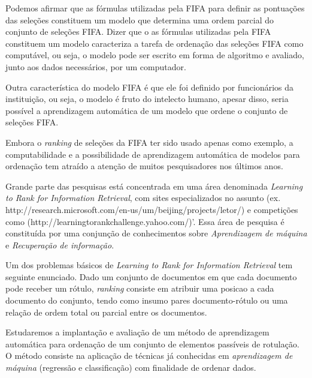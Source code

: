 Podemos afirmar que as fórmulas utilizadas pela FIFA para definir as pontuações das seleções constituem um modelo que determina uma ordem parcial do conjunto de seleções FIFA. Dizer que o as fórmulas utilizadas pela FIFA constituem um modelo caracteriza a tarefa de ordenação das seleções FIFA como computável, ou seja, o modelo pode ser escrito em forma de algoritmo e avaliado, junto aos dados necessários, por um computador.

Outra característica do modelo FIFA é que ele foi definido por funcionários da instituição, ou seja, o modelo é fruto do intelecto humano, apesar disso, seria possível a aprendizagem automática de um modelo que ordene o conjunto de seleções FIFA.

Embora o \emph{ranking} de seleções da FIFA ter sido usado apenas como exemplo, a computabilidade e a possibilidade de aprendizagem automática de modelos para ordenação tem atraído a atenção de muitos pesquisadores nos últimos anos.

Grande parte das pesquisas está concentrada em uma área denominada \emph{Learning to Rank for Information Retrieval}, com sites especializados no assunto (ex. http://research.microsoft.com/en-us/um/beijing/projects/letor/) e competições como (http://learningtorankchallenge.yahoo.com/)'. Essa área de pesquisa é constituída por uma conjunção de conhecimentos sobre \emph{Aprendizagem de máquina} e \emph{Recuperação de informação}.

Um dos problemas básicos de \emph{Learning to Rank for Information Retrieval} tem seguinte enunciado. Dado um conjunto de documentos em que cada documento pode receber um rótulo, \emph{ranking} consiste em atribuir uma posicao a cada documento do conjunto, tendo como insumo pares documento-rótulo ou uma relação de ordem total ou parcial entre os documentos.

Estudaremos a implantação e avaliação de um método de aprendizagem automática para ordenação de um conjunto de elementos passíveis de rotulação. O método consiste na aplicação de técnicas já conhecidas em \emph{aprendizagem de máquina} (regressão e classificação) com finalidade de ordenar dados.